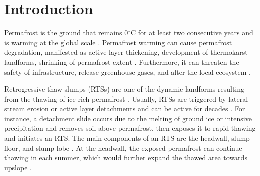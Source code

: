 \documentclass[authoryear,preprint,review,12pt]{elsarticle}
\begin{document}

\section{Introduction}
\label{sec_intro}

Permafrost is the ground that remains 0$^\circ$C for at least two consecutive years and is warming at the global scale \citep{biskaborn2019permafrost}. 
Permafrost warming can cause permafrost degradation, manifested as active layer thickening, development of thermokarst landforms, shrinking of permafrost extent \citep{czudek_thermokarst_1970,jorgenson_response_2005,osterkamp2007Characteristics,aakerman2008thawing,zhao2010Thermal}. 
Furthermore, it can threaten the safety of infrastructure, release greenhouse gases, and alter the local ecosystem \citep{tong_effect_1996,yang2010permafrost,bowden2010climate,grosse_vulnerability_2011,vonk2015reviews,schuur_climate_2015,olefeldt_circumpolar_2016,schuster2018permafrost,hjort2018degrading}.


Retrogressive thaw slumps (RTSs) are one of the dynamic landforms resulting from the thawing of ice-rich permafrost \citep{czudek_thermokarst_1970, jorgenson_thermokarst_2013,farquharson2016spatial,jones2019rapid}. 
Usually, RTSs are triggered by lateral stream erosion or active layer detachments \citep{french2017periglacial} and can be active for decades \citep{burn1989geomorphology, lacelle2010climatic, swanson2018growth}. 
For instance, a detachment slide occurs due to the melting of ground ice or intensive precipitation and removes soil above permafrost, then exposes it to rapid thawing and initiates an RTS. 
The main components of an RTS are the headwall, slump floor, and slump lobe \citep{lantuit_fifty_2008}. 
At the headwall, the exposed permafrost can continue thawing in each summer, which would further expand the thawed area towards upslope \citep{french2017periglacial}. 
\end{document}
